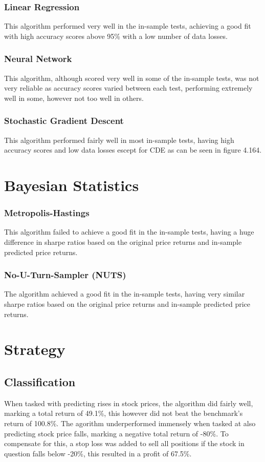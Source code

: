 \subsubsection{Linear Regression} 
This algorithm performed very well in the in-sample tests, achieving a good fit with high accuracy scores above 95\% with a low number of data losses.

\subsubsection{Neural Network}
This algorithm, although scored very well in some of the in-sample tests, was not very reliable as accuracy scores varied between each test, performing extremely well in some, however not too well in others. 

\subsubsection{Stochastic Gradient Descent}
This algorithm performed fairly well in most in-sample tests, having high accuracy scores and low data losses escept for CDE as can be seen in figure 4.164.

\section{Bayesian Statistics}

\subsubsection{Metropolis-Hastings}
This algorithm failed to achieve a good fit in the in-sample tests, having a huge difference in sharpe ratios based on the original price returns and in-sample predicted price returns. 

\subsubsection{No-U-Turn-Sampler (NUTS)}
The algorithm achieved a good fit in the in-sample tests, having very similar sharpe ratios  based on the original price returns and in-sample predicted price returns.

\section{Strategy}

\subsection{Classification}
When tasked with predicting rises in stock prices, the algorithm did fairly well, marking a total return of 49.1\%, this however did not beat the benchmark's return of 100.8\%. The agorithm underperformed immensely when tasked at also predicting stock price falls, marking a negative total return of -80\%. To compensate for this, a stop loss was added to sell all positions if the stock in question falls below -20\%, this resulted in a profit of 67.5\%.

